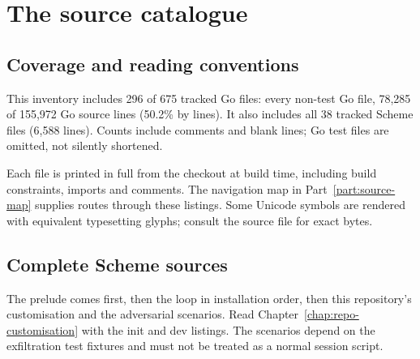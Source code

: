 
\part{The source catalogue}\label{part:source-catalogue}

\chapter{Coverage and reading conventions}

This inventory includes 296 of 675 tracked Go files: every non-test Go file, 78,285 of 155,972 Go source lines (50.2\% by lines). It also includes all 38 tracked Scheme files (6,588 lines). Counts include comments and blank lines; Go test files are omitted, not silently shortened.

Each file is printed in full from the checkout at build time, including build constraints, imports and comments. The navigation map in Part~\ref{part:source-map} supplies routes through these listings. Some Unicode symbols are rendered with equivalent typesetting glyphs; consult the source file for exact bytes.

\chapter{Complete Scheme sources}

The prelude comes first, then the loop in installation order, then this repository's customisation and the adversarial scenarios. Read Chapter~\ref{chap:repo-customisation} with the init and dev listings. The scenarios depend on the exfiltration test fixtures and must not be treated as a normal session script.










